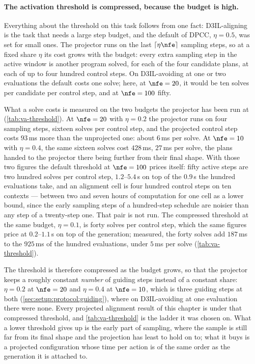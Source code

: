 \paragraph{The activation threshold is compressed, because the budget is high.}
Everything about the threshold on this task follows from one fact: D3IL-aligning is the task that needs a
large step budget, and the default of \ac{DPCC}, $\eta=0.5$, was set for small ones. The projector runs
on the last $\lceil \eta\nfe \rceil$ sampling steps, so at a fixed share $\eta$ its cost grows with the
budget: every extra sampling step in the active window is another program solved, for each of the four
candidate plans, at each of up to four hundred control steps. On D3IL-avoiding at one or two evaluations
the default costs one solve; here, at $\nfe=20$, it would be ten solves per candidate per control step,
and at $\nfe=100$ fifty.

What a solve costs is measured on the two budgets the projector has been run at
(\autoref{tab:va-threshold}). At $\nfe=20$ with $\eta=0.2$ the projector runs on four sampling steps,
sixteen solves per control step, and the projected control step costs $93$\,ms more than the unprojected
one: about $6$\,ms per solve. At $\nfe=10$ with $\eta=0.4$, the same sixteen solves cost $428$\,ms,
$27$\,ms per solve, the plans handed to the projector there being further from their final shape. With
those two figures the default threshold at $\nfe=100$ prices itself: fifty active steps are two hundred
solves per control step, $1.2$--$5.4$\,s on top of the $0.9$\,s the hundred evaluations take, and an
alignment cell is four hundred control steps on ten contexts --- between two and seven hours of computation
for one cell as a lower bound, since the early sampling steps of a hundred-step schedule are noisier than
any step of a twenty-step one. That pair is not run. The compressed threshold at the same budget,
$\eta=0.1$, is forty solves per control step, which the same figures price at $0.2$--$1.1$\,s on top of the
generation; measured, the forty solves add $187$\,ms to the $925$\,ms of the hundred evaluations, under
$5$\,ms per solve (\autoref{tab:va-threshold}).

The threshold is therefore compressed as the budget grows, so that the projector keeps a roughly constant
\emph{number} of guiding steps instead of a constant share: $\eta=0.2$ at $\nfe=20$ and $\eta=0.4$ at
$\nfe=10$, which is three guiding steps at both (\autoref{sec:setup:protocol:guiding}), where on
D3IL-avoiding at one evaluation there were none. Every projected alignment result of this chapter is under
that compressed threshold, and \autoref{tab:va-threshold} is the ladder it was chosen on. What a lower threshold gives up is the early part of sampling, where the sample is still
far from its final shape and the projection has least to hold on to; what it buys is a projected
configuration whose time per action is of the same order as the generation it is attached to.

